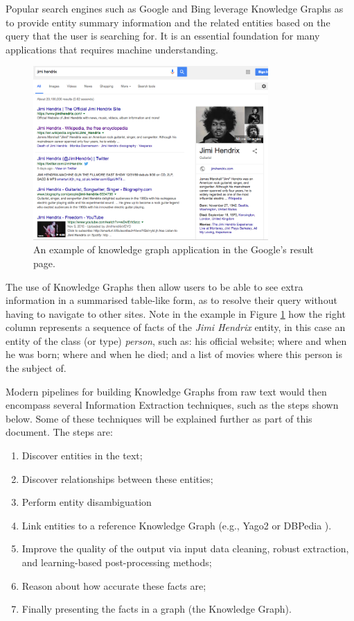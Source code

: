 \documentclass[11pt,a4paper,openright]{memoir}
\begin{document}
Popular search engines such as Google \cite{google} and Bing \cite{bing} leverage Knowledge Graphs as to provide entity summary information and the related entities based on the query that the user is searching for. It is an essential foundation for many applications that requires machine understanding.

\begin{figure}[!htbp]
  \centering
    \includegraphics[width=0.8\textwidth]{./images/google_knowledge_graph}
  \caption[An example of knowledge graph application.]{An example of knowledge graph application in the Google's result page.}
  \label{fig:google_knowledge_graph}
\end{figure}

The use of Knowledge Graphs then allow users to be able to see extra information in a summarised table-like form, as to resolve their query without having to navigate to other sites. Note in the example in Figure \ref{fig:google_knowledge_graph} how the right column represents a sequence of facts of the \emph{Jimi Hendrix} entity, in this case an entity of the class (or type) \emph{person}, such as: his official website; where and when he was born; where and when he died; and a list of movies where this person is the subject of.

Modern pipelines for building Knowledge Graphs from raw text would then encompass several Information Extraction techniques, such as the steps shown below. Some of these techniques will be explained further as part of this document. The steps are:
\begin{enumerate}
  \item Discover entities in the text;
  \item Discover relationships between these entities;
  \item Perform entity disambiguation
  \item Link entities to a reference Knowledge Graph (e.g., Yago2 \cite{Suchanek2007} or DBPedia \cite{dbpedia-swj}).
  \item Improve the quality of the output via input data cleaning, robust extraction, and learning-based post-processing methods;
  \item Reason about how accurate these facts are;
  \item Finally presenting the facts in a graph (the Knowledge Graph).
\end{enumerate}
\end{document}
